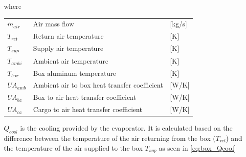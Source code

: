 where
\begin{center}
	\begin{tabular}{l p{8cm} l}
		$\dot{m}_{air}$ & Air mass flow                                & [\si{kg}/{\si{s}}] \\
		$T_{ret}$       & Return air temperature                       & [\si{K}]           \\
		$T_{sup}$       & Supply air temperature                       & [\si{K}]           \\
		$T_{ambi}$      & Ambient air temperature                      & [\si{K}]           \\
		$T_{box}$       & Box aluminum temperature                     & [\si{K}]           \\
		$U A_{amb}$     & Ambient air to box heat transfer coefficient & [\si{W}/\si{K}]    \\
		$U A_{ba}$      & Box to air heat transfer coefficient         & [\si{W}/\si{K}]    \\
		$U A_{ca}$   & Cargo to air heat transfer coefficient       & [\si{W}/\si{K}]    \\
	\end{tabular}
\end{center}

$Q_{cool}$ is the cooling provided by the evaporator. It is calculated based on the difference between the temperature of the air returning from the box ($T_{ret}$) and the temperature of the air supplied to the box $T_{sup}$ as seen in \cref{eq:box_Qcool}




